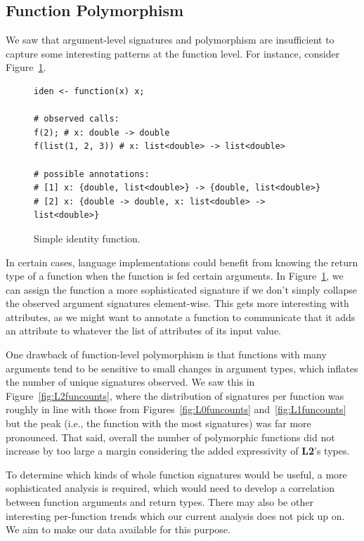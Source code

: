 \documentclass[acmsmall,10pt,review,anonymous]{acmart}\settopmatter{printfolios=true,printccs=false,printacmref=false}
\begin{document}
%
%
%
%
\subsection{Function Polymorphism}

We saw that argument-level signatures and polymorphism are insufficient to capture some interesting patterns at the function level.
For instance, consider Figure~\ref{fig:funanno}.

\begin{figure}[!hb]{\small\begin{lstlisting}[style=R]
iden <- function(x) x;

# observed calls:
f(2); # x: double -> double
f(list(1, 2, 3)) # x: list<double> -> list<double>

# possible annotations:
# [1] x: {double, list<double>} -> {double, list<double>}
# [2] x: {double -> double, x: list<double> -> list<double>}
\end{lstlisting}}\caption{Simple identity function.}\label{fig:funanno}\end{figure}

In certain cases, language implementations could benefit from knowing the return type of a function when the function is fed certain arguments.
In Figure~\ref{fig:funanno}, we can assign the function a more sophisticated signature if we don't simply collapse the observed argument signatures element-wise.
This gets more interesting with attributes, as we might want to annotate a function to communicate that it adds an attribute to whatever the list of attributes of its input value.

One drawback of function-level polymorphism is that functions with many arguments tend to be sensitive to small changes in argument types, which inflates the number of unique signatures observed.
We saw this in Figure~\ref{fig:L2funcounts}, where the distribution of signatures per function was roughly in line with those from Figures~\ref{fig:L0funcounts} and~\ref{fig:L1funcounts} but the peak (i.e., the function with the most signatures) was far more pronounced.
That said, overall the number of polymorphic functions did not increase by too large a margin considering the added expressivity of {\bf L2}'s types.

To determine which kinds of whole function signatures would be useful, a more sophisticated analysis is required, which would need to develop a correlation between function arguments and return types.
There may also be other interesting per-function trends which our current analysis does not pick up on.
We aim to make our data available for this purpose.
\end{document}
